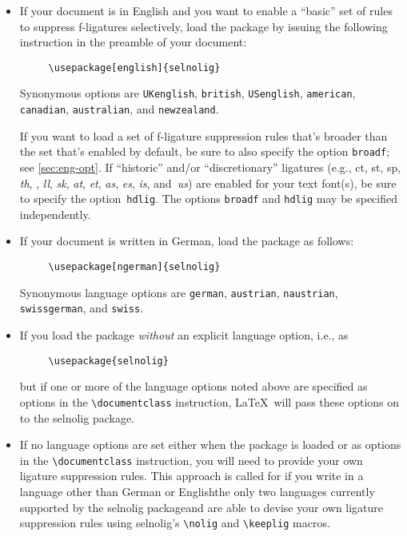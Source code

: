 \documentclass[11pt]{article}
\newcommand{\pkg}[1]{\textsf{#1}}
\newcommand{\opt}[1]{\texttt{#1}}
\newcommand{\cmmd}[1]{\texttt{\textbackslash #1}}
\begin{document}
\begin{itemize}
\item If your document is in English and you want to enable a \enquote{basic} set of rules to suppress f-ligatures selectively, load the package by issuing the following instruction in the preamble of your document:
\begin{Verbatim}
     \usepackage[english]{selnolig}
\end{Verbatim}
Synonymous options are \opt{UKenglish}, \opt{british}, \opt{USenglish}, \opt{american}, \opt{cana\-dian}, \opt{australian}, and \opt{new\-zea\-land}.

If you want to load a set of f-ligature suppression rules that's broader than the set that's enabled by default, be sure to also specify the option \opt{broadf}; see \cref{sec:eng-opt}. If \enquote{historic} and/or \enquote{discretionary} ligatures (e.g., ct, st, sp, \emph{th}, \emph{}, \emph{ll}, \emph{\ebg sk}, \emph{at}, \emph{et}, \emph{as}, \emph{\ebg es}, \emph{is}, and~\emph{us}) are enabled for your text font(s), be sure to specify the option~\opt{hdlig}. The options \opt{broadf} and \opt{hdlig} may be specified independently.

\enlargethispage{1\baselineskip}

\item If your document is written in German, load the package as follows:
\begin{Verbatim}
     \usepackage[ngerman]{selnolig}
\end{Verbatim}
Synonymous language options are \opt{german}, \opt{austrian}, \opt{naustrian}, \opt{swissgerman}, and \opt{swiss}.

\item If you load the package \emph{without} an explicit language option, i.e., as
\begin{Verbatim}
     \usepackage{selnolig}
\end{Verbatim}
but if one or more of the language options noted above are specified as options in the \cmmd{documentclass} instruction, \LaTeX\ will pass these options on to the \pkg{selnolig} package.

\item If no language options are set either when the package is loaded or as options in the \cmmd{documentclass} instruction, you will need to provide your own ligature suppression rules. This approach is called for if you write in a language other than German or English\textemdash the only two languages currently supported by the \pkg{selnolig} package\textemdash and are able to devise your own ligature suppression rules using \pkg{selnolig}'s \cmmd{nolig} and \cmmd{keeplig} macros.

\end{itemize}
\end{document}
